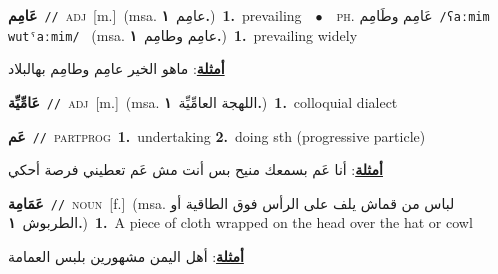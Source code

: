 \documentclass[10pt,a4paper,twoside]{article} %
\begin{document}
\begin{multicols}{2}
{\setlength\topsep{0pt}\textbf{\foreignlanguage{arabic}{عَامِم}}\ {\color{gray}\texttt{//}\color{black}}\ \textsc{adj}\ [m.]\ \color{gray}(msa. \foreignlanguage{arabic}{عامِم}~\foreignlanguage{arabic}{\textbf{١.}})\color{black}\ \textbf{1.}~prevailing\ \ $\bullet$\ \ \textsc{ph.} \color{gray} \foreignlanguage{arabic}{عَامِم وطَامِم}\color{black}\ {\color{gray}\texttt{/{\sffamily ʕaːmim wutˤaːmim}/}\color{black}}\ \color{gray} (msa. \foreignlanguage{arabic}{عامِم وطامِم}~\foreignlanguage{arabic}{\textbf{١.}})\color{black}\ \textbf{1.}~prevailing widely\  \begin{flushright}\color{gray}\foreignlanguage{arabic}{\textbf{\underline{\foreignlanguage{arabic}{أمثلة}}}: ماهو الخير عامِم وطامِم بهالبلاد}\end{flushright}\color{black}} \vspace{2mm}

{\setlength\topsep{0pt}\textbf{\foreignlanguage{arabic}{عَامِّيِّة}}\ {\color{gray}\texttt{//}\color{black}}\ \textsc{adj}\ [m.]\ \color{gray}(msa. \foreignlanguage{arabic}{اللهجة العامِّيِّة}~\foreignlanguage{arabic}{\textbf{١.}})\color{black}\ \textbf{1.}~colloquial dialect\ } \vspace{2mm}

{\setlength\topsep{0pt}\textbf{\foreignlanguage{arabic}{عَم}}\ {\color{gray}\texttt{//}\color{black}}\ \textsc{part\textunderscore prog}\ \textbf{1.}~undertaking  \textbf{2.}~doing sth (progressive particle)\  \begin{flushright}\color{gray}\foreignlanguage{arabic}{\textbf{\underline{\foreignlanguage{arabic}{أمثلة}}}: أنا عَم بسمعك منيح بس أنت مش عَم تعطيني فرصة أحكي}\end{flushright}\color{black}} \vspace{2mm}

{\setlength\topsep{0pt}\textbf{\foreignlanguage{arabic}{عَمَامِة}}\ {\color{gray}\texttt{//}\color{black}}\ \textsc{noun}\ [f.]\ \color{gray}(msa. \foreignlanguage{arabic}{لباس من قماش يلف على الرأس فوق الطاقية أو الطربوش}~\foreignlanguage{arabic}{\textbf{١.}})\color{black}\ \textbf{1.}~A piece of cloth wrapped on the head over the hat or cowl\  \begin{flushright}\color{gray}\foreignlanguage{arabic}{\textbf{\underline{\foreignlanguage{arabic}{أمثلة}}}: أهل اليمن مشهورين بلبس العمامة}\end{flushright}\color{black}} \vspace{2mm}


\end{multicols}
\end{document}
